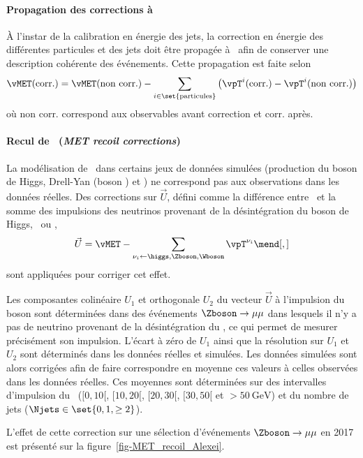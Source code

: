 \paragraph{Propagation des corrections à \MET}
À l'instar de la calibration en énergie des jets,
la correction en énergie des différentes particules et des jets doit être propagée à \MET\ afin de conserver une description cohérente des événements.
Cette propagation est faite selon
\begin{equation}
\vMET(\text{corr.}) = \vMET(\text{non corr.}) - \sum_{i\in\set{\text{particules}}} \left( \vpT^i(\text{corr.}) - \vpT^i(\text{non corr.}) \right)
\end{equation}
où
\og non corr. \fg{} correspond aux observables avant correction
et
\og corr. \fg{} après.
\paragraph{Recul de \MET\ (\emph{MET recoil corrections})}
La modélisation de \MET\ dans certains jeux de données simulées (production du boson de Higgs, Drell-Yan (boson \Zboson) et \Wjets) ne correspond pas aux observations dans les données réelles.
Des corrections sur $\vec{U}$, défini comme la différence entre \MET\ et la somme des impulsions des neutrinos provenant de la désintégration du boson de Higgs, \Zboson\ ou \Wboson, \ie
\begin{equation}
\vec{U} = \vMET - \sum_{\nu_i \leftarrow \higgs,\Zboson,\Wboson} \vpT^{\nu_i}
\mend[,]
\end{equation}
sont appliquées pour corriger cet effet.
\par
Les composantes colinéaire $U_1$ et orthogonale $U_2$ du vecteur $\vec{U}$ à l'impulsion du boson sont déterminées dans des événements $\Zboson\to\mu\mu$ dans lesquels il n'y a pas de neutrino provenant de la désintégration du \Zboson, ce qui permet de mesurer précisément son impulsion.
L'écart à zéro de $U_1$ ainsi que la résolution sur $U_1$ et $U_2$ sont déterminés dans les données réelles et simulées.
Les données simulées sont alors corrigées afin de faire correspondre en moyenne ces valeurs à celles observées dans les données réelles.
Ces moyennes sont déterminées sur des intervalles d'impulsion du \Zboson\ ($[\num{0}, \num{10}[$, $[\num{10}, \num{20}[$, $[\num{20}, \num{30}[$, $[\num{30}, \num{50}[$ et $>\SI{50}{\GeV}$) et du nombre de jets ($\Njets\in\set{0, 1, \geq2}$).
\par
L'effet de cette correction sur une sélection d'événements $\Zboson\to\mu\mu$ en 2017 est présenté sur la figure~\ref{fig-MET_recoil_Alexei}.
